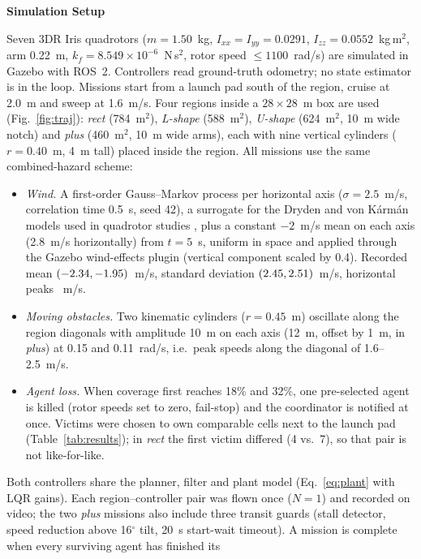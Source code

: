 \documentclass[10pt,letterpaper]{article}
\newif\ifafterheadone
\newcommand{\headingtwo}[1]{\par\ifafterheadone\nopagebreak\else\addpenalty{-200}\fi\vspace{6pt}%
    {\centering\fontsize{12}{14}\selectfont\bfseries #1\par}%
    \nopagebreak\vspace{2pt}\nopagebreak\global\afterheadonefalse\noindent\ignorespaces}
\begin{document}
\headingtwo{Simulation Setup}
Seven 3DR Iris quadrotors ($m=1.50$~kg, $I_{xx}=I_{yy}=0.0291$, $I_{zz}=0.0552$~kg\,m$^2$, arm
0.22~m, $k_f=8.549\times10^{-6}$~N\,s$^2$, rotor speed $\le1100$~rad/s) are simulated in Gazebo
\cite{koenigGazebo2004} with ROS~2. Controllers read ground-truth odometry; no state estimator
is in the loop. Missions start from a launch pad south of the region, cruise at 2.0~m and sweep
at 1.6~m/s. Four regions inside a $28\times28$~m box are used (Fig.~\ref{fig:traj}): \emph{rect}
(784~m$^2$), \emph{L-shape} (588~m$^2$), \emph{U-shape} (624~m$^2$, 10~m wide notch) and
\emph{plus} (460~m$^2$, 10~m wide arms), each with nine vertical cylinders ($r=0.40$~m, 4~m
tall) placed inside the region. All missions use the same combined-hazard scheme:
\begin{itemize}[leftmargin=1.2em,itemsep=0pt,topsep=1pt,parsep=0pt]
\item \emph{Wind.} A first-order Gauss--Markov process per horizontal axis ($\sigma=2.5$~m/s,
      correlation time 0.5~s, seed 42), a surrogate for the Dryden and von K\'arm\'an
      models used in quadrotor studies \cite{mirandaMoyaTurbulentWind2023}, plus a constant $-2$~m/s mean on each
      axis (2.8~m/s horizontally) from $t=5$~s, uniform in space and applied through the Gazebo wind-effects plugin
      (vertical component scaled by 0.4). Recorded mean $(-2.34,-1.95)$~m/s, standard
      deviation $(2.45,2.51)$~m/s, horizontal peaks \WindMaxH~m/s.
\item \emph{Moving obstacles.} Two kinematic cylinders ($r=0.45$~m) oscillate along the region
      diagonals with amplitude 10~m on each axis (12~m, offset by 1~m, in \emph{plus}) at 0.15 and
      0.11~rad/s, i.e.\ peak speeds along the diagonal of 1.6--2.5~m/s.
\item \emph{Agent loss.} When coverage first reaches 18\% and 32\%, one pre-selected agent is
      killed (rotor speeds set to zero, fail-stop) and the coordinator is notified at once.
      Victims were chosen to own comparable cells next to the launch pad (Table~\ref{tab:results});
      in \emph{rect} the first victim differed (4 vs.\ 7), so that pair is not like-for-like.
\end{itemize}
Both controllers share the planner, filter and plant model (Eq.~\eqref{eq:plant} with LQR gains).
Each region--controller pair was flown once ($N=1$) and recorded on video; the two \emph{plus}
missions also include three transit guards (stall detector, speed reduction above 16$^\circ$
tilt, 20~s start-wait timeout). A mission is complete when every surviving agent has finished its
\end{document}
